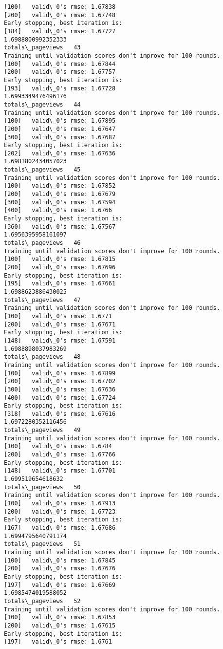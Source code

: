 \documentclass[11pt]{article}
\begin{document}
\begin{Verbatim}[commandchars=\\\{\}]
[100]	valid\_0's rmse: 1.67838
[200]	valid\_0's rmse: 1.67748
Early stopping, best iteration is:
[184]	valid\_0's rmse: 1.67727
1.6988800992352333
totals\_pageviews   43
Training until validation scores don't improve for 100 rounds.
[100]	valid\_0's rmse: 1.67844
[200]	valid\_0's rmse: 1.67757
Early stopping, best iteration is:
[193]	valid\_0's rmse: 1.67728
1.6993349476496176
totals\_pageviews   44
Training until validation scores don't improve for 100 rounds.
[100]	valid\_0's rmse: 1.67895
[200]	valid\_0's rmse: 1.67647
[300]	valid\_0's rmse: 1.67687
Early stopping, best iteration is:
[202]	valid\_0's rmse: 1.67636
1.6981802434057023
totals\_pageviews   45
Training until validation scores don't improve for 100 rounds.
[100]	valid\_0's rmse: 1.67852
[200]	valid\_0's rmse: 1.67679
[300]	valid\_0's rmse: 1.67594
[400]	valid\_0's rmse: 1.6766
Early stopping, best iteration is:
[360]	valid\_0's rmse: 1.67567
1.6956395958161097
totals\_pageviews   46
Training until validation scores don't improve for 100 rounds.
[100]	valid\_0's rmse: 1.67815
[200]	valid\_0's rmse: 1.67696
Early stopping, best iteration is:
[195]	valid\_0's rmse: 1.67661
1.6988623886430025
totals\_pageviews   47
Training until validation scores don't improve for 100 rounds.
[100]	valid\_0's rmse: 1.6771
[200]	valid\_0's rmse: 1.67671
Early stopping, best iteration is:
[148]	valid\_0's rmse: 1.67591
1.6988898037983269
totals\_pageviews   48
Training until validation scores don't improve for 100 rounds.
[100]	valid\_0's rmse: 1.67899
[200]	valid\_0's rmse: 1.67702
[300]	valid\_0's rmse: 1.67636
[400]	valid\_0's rmse: 1.67724
Early stopping, best iteration is:
[318]	valid\_0's rmse: 1.67616
1.6972280352116456
totals\_pageviews   49
Training until validation scores don't improve for 100 rounds.
[100]	valid\_0's rmse: 1.6784
[200]	valid\_0's rmse: 1.67766
Early stopping, best iteration is:
[148]	valid\_0's rmse: 1.67701
1.699519654618632
totals\_pageviews   50
Training until validation scores don't improve for 100 rounds.
[100]	valid\_0's rmse: 1.67913
[200]	valid\_0's rmse: 1.67723
Early stopping, best iteration is:
[167]	valid\_0's rmse: 1.67686
1.6994795640791174
totals\_pageviews   51
Training until validation scores don't improve for 100 rounds.
[100]	valid\_0's rmse: 1.67845
[200]	valid\_0's rmse: 1.67676
Early stopping, best iteration is:
[197]	valid\_0's rmse: 1.67669
1.6985474019588052
totals\_pageviews   52
Training until validation scores don't improve for 100 rounds.
[100]	valid\_0's rmse: 1.67853
[200]	valid\_0's rmse: 1.67615
Early stopping, best iteration is:
[197]	valid\_0's rmse: 1.6761

\end{Verbatim}
\end{document}
